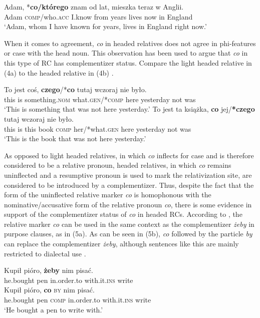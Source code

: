 \documentclass[output=paper]{langsci/langscibook}
\begin{document}
\ea%
    \label{ex:leska:3}
    \gll Adam, *\textbf{co/którego} znam od lat, mieszka teraz w Anglii.    \\
         Adam \textsc{comp}/who\textsc{.acc} I.know from years lives now in England\\
    \glt ‘Adam, whom I have known for years, lives in England right now.’
    \z


When it comes to agreement, \textit{co} in headed relatives does not agree in phi-features or case with the head noun. This observation has been used to argue that \textit{co} in this type of RC has complementizer status. Compare the light headed relative in (4a) to the headed relative in (4b) \citep{Citko2004}.

\ea%
    \label{ex:leska:4}
    \ea
    \gll To   jest   coś,   \textbf{czego}/*\textbf{co}   tutaj  wczoraj    nie   było.   \\
         this   is   something.\textsc{nom}   what.\textsc{gen}/*\textsc{comp}  here  yesterday  not   was\\
    \glt ‘This is something that was not here yesterday.’
    \ex
    \gll To   jest   ta   książka,   \textbf{co}   jej/\textbf{*czego}   tutaj  wczoraj   nie  było.        \\
         this   is   this   book   \textsc{comp}   her/*what.\textsc{gen}   here   yesterday  not  was\\
    \glt ‘This is the book that was not here yesterday.’
    \z
\z

As opposed to light headed relatives, in which \textit{co} inflects for case and is therefore considered to be a relative pronoun, headed relatives, in which \textit{co} remains uninflected and a resumptive pronoun is used to mark the relativization site, are considered to be introduced by a complementizer. Thus, despite the fact that the form of the uninflected relative marker \textit{co} is homophonous with the nominative\slash accusative form of the relative pronoun \textit{co}, there is some evidence in support of the complementizer status of \textit{co} in headed RCs. According to \citet{Bondaruk1995}, the relative marker \textit{co} can be used in the same context as the complementizer \textit{żeby} in purpose clauses, as in (5a). As can be seen in (5b), \textit{co} followed by the particle \textit{by} can replace the complementizer \textit{żeby}, although sentences like this are mainly restricted to dialectal use \citep[35]{Bondaruk1995}.

\ea%
    \label{ex:leska:5}
    \ea
    \gll Kupił   pióro,  \textbf{żeby} nim   pisać.\\
         he.bought   pen   in.order.to   with.it.\textsc{ins}  write\\
    \ex
    \gll Kupił   pióro,   \textbf{co}   \textsc{by}   nim   pisać.\\
         he.bought   pen   \textsc{comp} in.order.to   with.it.\textsc{ins}  write\\
    \glt ‘He bought a pen to write with.’
    \z
\z
\end{document}
